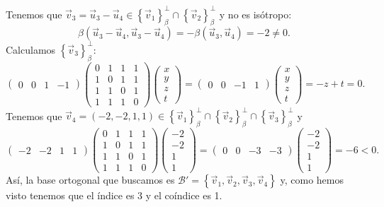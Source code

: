 \documentclass{article}
\begin{document}
\begin{sol}
Tenemos que $\displaystyle \vec{v}_{3} = \vec{u}_{3}-\vec{u}_{4} \in \left\{ \vec{v}_{1}\right\} ^{\perp }_{\beta }\cap \left\{ \vec{v}_{2}\right\} ^{\perp }_{\beta }$ y no es isótropo:
\[\beta\left(\vec{u}_{3}-\vec{u}_{4}, \vec{u}_{3}-\vec{u}_{4}\right) = -\beta\left(\vec{u}_{3}, \vec{u}_{4}\right) = - 2 \neq 0 .\]
Calculamos $\displaystyle \left\{ \vec{v}_{3}\right\} ^{\perp }_{\beta} $:
\[\begin{pmatrix} 0 & 0 & 1 & - 1 \end{pmatrix}\begin{pmatrix} 0 & 1 & 1 & 1 \\
1 & 0 & 1 & 1 \\
1 & 1 & 0 & 1 \\
1 & 1 & 1 & 0\end{pmatrix}\begin{pmatrix} x \\ y \\ z \\ t \end{pmatrix} = \begin{pmatrix} 0 & 0 & - 1 & 1 \end{pmatrix} \begin{pmatrix}  x\\ y \\ z\\ t \end{pmatrix} =\boxed{ -z + t = 0 }.\]
Tenemos que $\displaystyle \vec{v}_{4} = \left(-2, -2, 1, 1\right) \in \left\{ \vec{v}_{1}\right\} ^{\perp }_{\beta }\cap \left\{ \vec{v}_{2}\right\} ^{\perp }_{\beta }\cap \left\{ \vec{v}_{3}\right\} ^{\perp }_{\beta } $ y 
\[ \begin{pmatrix} -2 & - 2 & 1 & 1 \end{pmatrix}\begin{pmatrix} 0 & 1 & 1 & 1 \\
1 & 0 & 1 & 1 \\
1 & 1 & 0 & 1 \\
1 & 1 & 1 & 0\end{pmatrix}\begin{pmatrix} - 2\\ - 2\\ 1 \\ 1 \end{pmatrix}=\begin{pmatrix} 0 & 0 & -3 & - 3 \end{pmatrix}\begin{pmatrix} -2 \\ - 2\\ 1 \\ 1 \end{pmatrix} = - 6 < 0.\]
Así, la base ortogonal que buscamos es $\displaystyle \mathcal{B}'= \left\{ \vec{v}_{1}, \vec{v}_{2}, \vec{v}_{3}, \vec{v}_{4}\right\}  $ y, como hemos visto tenemos que el índice es 3 y el coíndice es 1.
\end{sol}
\end{document}
